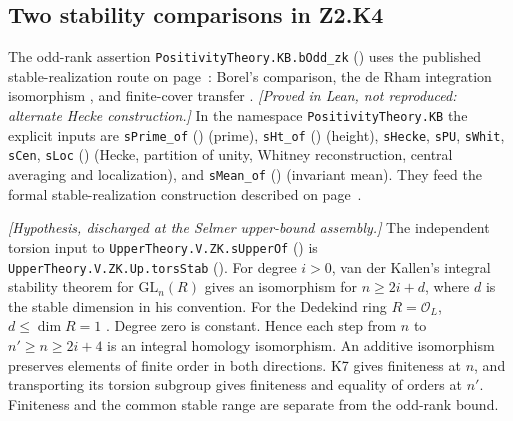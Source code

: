 \subsection{Two stability comparisons in Z2.K4}\label{r7:review:Z2.K4}
The odd-rank assertion \nolinkurl{PositivityTheory.KB.bOdd_zk} () uses the published stable-realization route on page~\pageref{r6:review:Z2.K4}: Borel's comparison, the de Rham integration isomorphism \cite[Theorem 18.14]{P-R6-Lee-derham}, and finite-cover transfer \cite[\S3.G]{P-R6-Hatcher}. \emph{[Proved in Lean, not reproduced: alternate Hecke construction.]} In the namespace \nolinkurl{PositivityTheory.KB} the explicit inputs are \nolinkurl{sPrime_of} () (prime), \nolinkurl{sHt_of} () (height), \nolinkurl{sHecke}, \nolinkurl{sPU}, \nolinkurl{sWhit}, \nolinkurl{sCen}, \nolinkurl{sLoc} () (Hecke, partition of unity, Whitney reconstruction, central averaging and localization), and \nolinkurl{sMean_of} () (invariant mean). They feed the formal stable-realization construction described on page~\pageref{r6:review:Z2.K4}.

\emph{[Hypothesis, discharged at the Selmer upper-bound assembly.]} The independent torsion input to \nolinkurl{UpperTheory.V.ZK.sUpperOf} () is \nolinkurl{UpperTheory.V.ZK.Up.torsStab} (). For degree $i>0$, van der Kallen's integral stability theorem for $\mathrm{GL}_n(R)$ gives an isomorphism for $n\ge2i+d$, where $d$ is the stable dimension in his convention. For the Dedekind ring $R=\mathcal O_L$, $d\le\dim R=1$ \cite[\S2.2 and Theorem 4.11(a)]{P-R7-vdK}. Degree zero is constant. Hence each step from $n$ to $n'\ge n\ge2i+4$ is an integral homology isomorphism. An additive isomorphism preserves elements of finite order in both directions. K7 gives finiteness at $n$, and transporting its torsion subgroup gives finiteness and equality of orders at $n'$. Finiteness and the common stable range are separate from the odd-rank bound.

